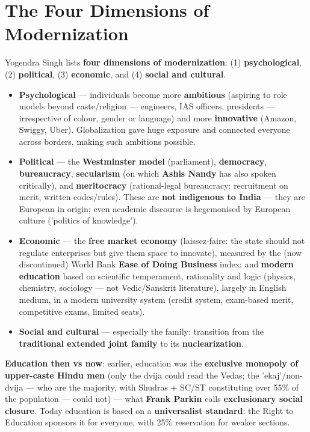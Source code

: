 \section{The Four Dimensions of Modernization}

\begin{KeyConcept}
Yogendra Singh lists \textbf{four dimensions of modernization}: (1) \textbf{psychological}, (2) \textbf{political}, (3) \textbf{economic}, and (4) \textbf{social and cultural}.
\end{KeyConcept}

\begin{itemize}
\item \textbf{Psychological} --- individuals become more \textbf{ambitious} (aspiring to role models beyond caste/religion --- engineers, IAS officers, presidents --- irrespective of colour, gender or language) and more \textbf{innovative} (Amazon, Swiggy, Uber). Globalization gave huge exposure and connected everyone across borders, making such ambitions possible.
\item \textbf{Political} --- the \textbf{Westminster model} (parliament), \textbf{democracy}, \textbf{bureaucracy}, \textbf{secularism} (on which \textbf{Ashis Nandy} has also spoken critically), and \textbf{meritocracy} (rational-legal bureaucracy: recruitment on merit, written codes/rules). These are \textbf{not indigenous to India} --- they are European in origin; even academic discourse is hegemonised by European culture ('politics of knowledge').
\item \textbf{Economic} --- the \textbf{free market economy} (laissez-faire: the state should not regulate enterprises but give them space to innovate), measured by the (now discontinued) World Bank \textbf{Ease of Doing Business} index; and \textbf{modern education} based on scientific temperament, rationality and logic (physics, chemistry, sociology --- not Vedic/Sanskrit literature), largely in English medium, in a modern university system (credit system, exam-based merit, competitive exams, limited seats).
\item \textbf{Social and cultural} --- especially the family: transition from the \textbf{traditional extended joint family} to its \textbf{nuclearization}.
\end{itemize}

\begin{KeyConcept}
\textbf{Education then vs now}: earlier, education was the \textbf{exclusive monopoly of upper-caste Hindu men} (only the dvija could read the Vedas; the 'ekaj'/non-dvija --- who are the majority, with Shudras + SC/ST constituting over 55\% of the population --- could not) --- what \textbf{Frank Parkin} calls \textbf{exclusionary social closure}. Today education is based on a \textbf{universalist standard}: the Right to Education sponsors it for everyone, with 25\% reservation for weaker sections.
\end{KeyConcept}


